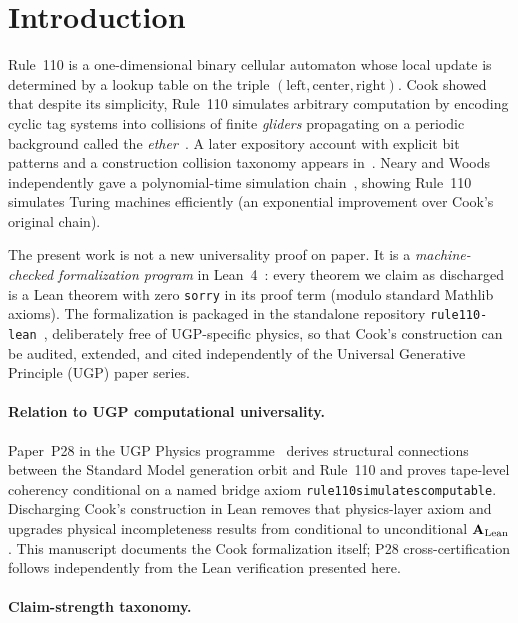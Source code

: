 \documentclass[11pt]{article}
\theoremstyle{remark}
\newcommand{\CatAL}{\ensuremath{\textbf{A}_{\rm Lean}}}
\newcommand{\lean}[1]{%
  \penalty-100
  \begingroup\def\_{\textunderscore\allowbreak}\texttt{#1}\endgroup}
\begin{document}
\tableofcontents

\section{Introduction}
\label{sec:introduction}

Rule~110 is a one-dimensional binary cellular automaton whose local update is determined
by a lookup table on the triple $(\text{left},\text{center},\text{right})$.
Cook showed that despite its simplicity, Rule~110 simulates arbitrary computation by
encoding cyclic tag systems into collisions of finite \emph{gliders} propagating on a
periodic background called the \emph{ether}~\cite{Cook2004}.
A later expository account with explicit bit patterns and a construction collision taxonomy
appears in~\cite{Cook2009}.
Neary and Woods independently gave a polynomial-time simulation chain~\cite{NearyW06},
showing Rule~110 simulates Turing machines efficiently (an exponential improvement over
Cook's original chain).

The present work is not a new universality proof on paper.
It is a \emph{machine-checked formalization program} in Lean~4~\cite{deMoura2021Lean}:
every theorem we claim as discharged is a Lean theorem with zero \texttt{sorry} in its
proof term (modulo standard Mathlib axioms).
The formalization is packaged in the standalone repository \texttt{rule110-lean}~\cite{rule110-lean},
deliberately free of UGP-specific physics, so that Cook's construction can be audited,
extended, and cited independently of the Universal Generative Principle (UGP) paper series.

\paragraph{Relation to UGP computational universality.}
Paper~P28 in the UGP Physics programme~\cite{SpivackCompUniversality,SpivackResearchProgrammes} derives structural
connections between the Standard Model generation orbit and Rule~110 and proves
tape-level coherency conditional on a named bridge axiom
\lean{rule110\_simulates\_computable}.
Discharging Cook's construction in Lean removes that physics-layer axiom and upgrades
physical incompleteness results from conditional to unconditional $\CatAL$.
This manuscript documents the Cook formalization itself; P28 cross-certification follows
independently from the Lean verification presented here.

\paragraph{Claim-strength taxonomy.}\leavevmode
\end{document}
